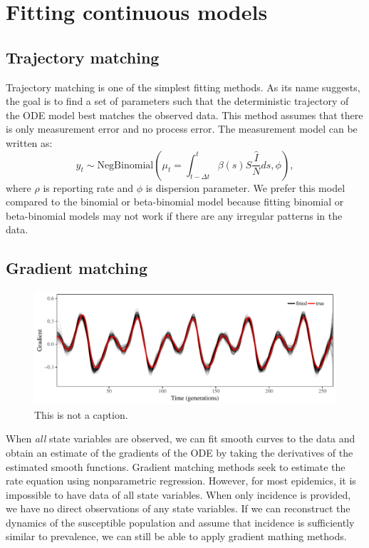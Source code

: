 \documentclass{article}
\begin{document}
\section{Fitting continuous models}

\subsection{Trajectory matching}

Trajectory matching is one of the simplest fitting methods.
As its name suggests, the goal is to find a set of parameters such that the deterministic trajectory of the ODE model best matches the observed data.
This method assumes that there is only measurement error and no process error.
The measurement model can be written as:
\begin{equation}
y_t \sim \mathrm{NegBinomial}\left(\mu_t= \int_{t-\Delta t}^{t} \beta(s) S \frac{\hat{I}}{N} ds, \phi \right),
\end{equation}
where $\rho$ is reporting rate and $\phi$ is dispersion parameter.
We prefer this model compared to the binomial or beta-binomial model because fitting binomial or beta-binomial models may not work if there are any irregular patterns in the data.

\subsection{Gradient matching}

\begin{figure}[t]
\includegraphics[width=\textwidth]{../figure/gradient_matching_sinusoidal.pdf}
\caption{This is not a caption.}
\end{figure}

When \emph{all} state variables are observed, we can fit smooth curves to the data and obtain an estimate of the gradients of the ODE by taking the derivatives of the estimated smooth functions.
Gradient matching methods seek to estimate the rate equation using nonparametric regression.
However, for most epidemics, it is impossible to have data of all state variables.
When only incidence is provided, we have no direct observations of any state variables. 
If we can reconstruct the dynamics of the susceptible population and assume that incidence is sufficiently similar to prevalence, we can still be able to apply gradient mathing methods.
\end{document}
